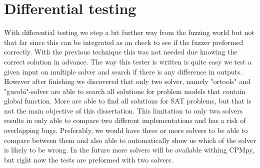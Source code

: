 
%

\section{Differential testing}
With differential testing we step a bit further way from the fuzzing world but not that far since this can be integrated as an check to see if the fuzzer preformed correctly. With the previous technique this was not needed due knowing the correct solution in advance. The way this tester is written is quite easy we test a given input on multiple solver and search if there is any difference in outputs.
However after finishing we discovered that only two solver, namely "ortools" and "gurobi"-solver are able to search all solutions for problem models that contain global function. More are able to find all solutions for SAT problems, but that is not the main objective of this dissertation. This limitation to only two solvers results in only able to compare two different implementations and has a risk of overlapping bugs. Preferably, we would have three or more solvers to be able to compare between them and also able to automatically show us which of the solver is likely to be wrong. In the future more solvers will be available withing CPMpy, but right now the tests are preformed with two solvers.

